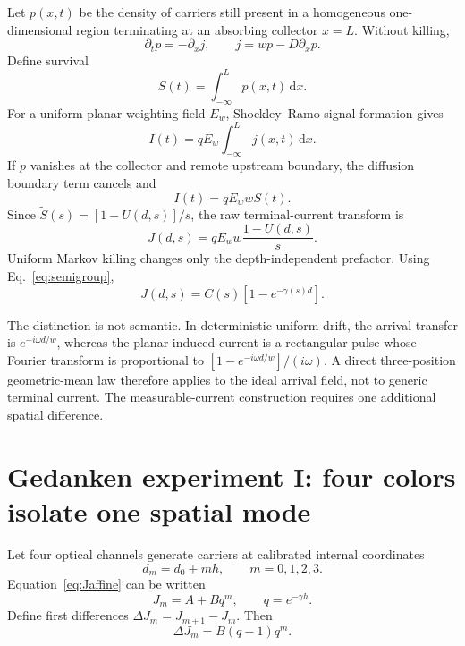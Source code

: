 \documentclass[11pt]{article}
\newcommand{\dd}{\mathrm{d}}
\begin{document}
Let $p(x,t)$ be the density of carriers still present in a homogeneous one-dimensional region terminating at an absorbing collector $x=L$. Without killing,
\begin{equation}
\partial_t p=-\partial_x j,
\qquad
j=wp-D\partial_xp.
\label{eq:continuity}
\end{equation}
Define survival
\begin{equation}
S(t)=\int_{-\infty}^{L}p(x,t)\,\dd x.
\end{equation}
For a uniform planar weighting field $E_w$, Shockley--Ramo signal formation \cite{Shockley1938,Ramo1939,Dabrowski1989} gives
\begin{equation}
I(t)=qE_w\int_{-\infty}^{L}j(x,t)\,\dd x.
\end{equation}
If $p$ vanishes at the collector and remote upstream boundary, the diffusion boundary term cancels and
\begin{equation}
\boxed{I(t)=qE_w w S(t).}
\label{eq:ramo_survival}
\end{equation}
Since $\widetilde S(s)=[1-U(d,s)]/s$, the raw terminal-current transform is
\begin{equation}
J(d,s)=qE_w w\frac{1-U(d,s)}{s}.
\label{eq:Jnokill}
\end{equation}
Uniform Markov killing changes only the depth-independent prefactor. Using Eq.~\eqref{eq:semigroup},
\begin{equation}
\boxed{J(d,s)=C(s)\left[1-e^{-\gamma(s)d}\right].}
\label{eq:Jaffine}
\end{equation}

The distinction is not semantic. In deterministic uniform drift, the arrival transfer is $e^{-i\omega d/w}$, whereas the planar induced current is a rectangular pulse whose Fourier transform is proportional to $[1-e^{-i\omega d/w}]/(i\omega)$. A direct three-position geometric-mean law therefore applies to the ideal arrival field, not to generic terminal current. The measurable-current construction requires one additional spatial difference.

\section{Gedanken experiment I: four colors isolate one spatial mode}

Let four optical channels generate carriers at calibrated internal coordinates
\begin{equation}
d_m=d_0+mh,
\qquad m=0,1,2,3.
\label{eq:fourcoords}
\end{equation}
Equation~\eqref{eq:Jaffine} can be written
\begin{equation}
J_m=A+Bq^m,
\qquad q=e^{-\gamma h}.
\label{eq:affineseq}
\end{equation}
Define first differences $\Delta J_m=J_{m+1}-J_m$. Then
\begin{equation}
\Delta J_m=B(q-1)q^m.
\label{eq:firstdiff}
\end{equation}
\end{document}
